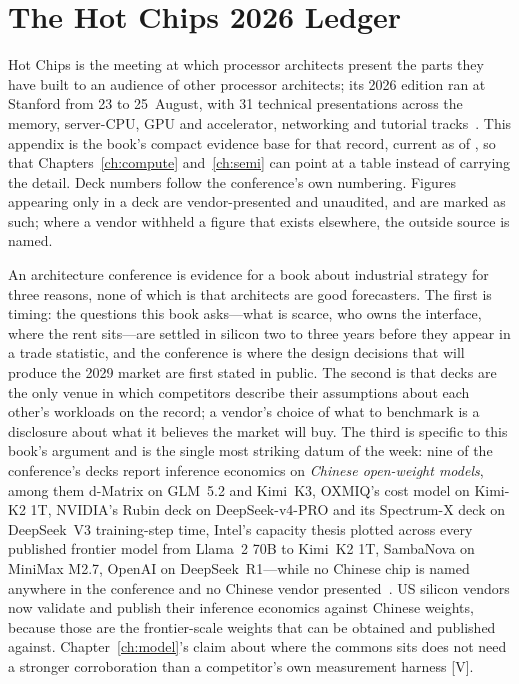 \chapter{The Hot Chips 2026 Ledger}
\label{app:hotchips}

Hot Chips is the meeting at which processor architects present the parts they have built to an audience of other processor architects; its 2026 edition ran at Stanford from 23 to 25~August, with 31 technical presentations across the memory, server-CPU, GPU and accelerator, networking and tutorial tracks~\cite{hc2026}. This appendix is the book's compact evidence base for that record, current as of \datafreeze, so that Chapters~\ref{ch:compute} and~\ref{ch:semi} can point at a table instead of carrying the detail. Deck numbers follow the conference's own numbering. Figures appearing only in a deck are vendor-presented and unaudited, and are marked as such; where a vendor withheld a figure that exists elsewhere, the outside source is named.

An architecture conference is evidence for a book about industrial strategy for three reasons, none of which is that architects are good forecasters. The first is timing: the questions this book asks---what is scarce, who owns the interface, where the rent sits---are settled in silicon two to three years before they appear in a trade statistic, and the conference is where the design decisions that will produce the 2029 market are first stated in public. The second is that decks are the only venue in which competitors describe their assumptions about each other's workloads on the record; a vendor's choice of what to benchmark is a disclosure about what it believes the market will buy. The third is specific to this book's argument and is the single most striking datum of the week: nine of the conference's decks report inference economics on \emph{Chinese open-weight models}, among them d-Matrix on GLM~5.2 and Kimi~K3, OXMIQ's cost model on Kimi-K2 1T, NVIDIA's Rubin deck on DeepSeek-v4-PRO and its Spectrum-X deck on DeepSeek~V3 training-step time, Intel's capacity thesis plotted across every published frontier model from Llama~2 70B to Kimi~K2 1T, SambaNova on MiniMax M2.7, OpenAI on DeepSeek~R1---while no Chinese chip is named anywhere in the conference and no Chinese vendor presented~\cite{hc2026-china-bench}. US silicon vendors now validate and publish their inference economics against Chinese weights, because those are the frontier-scale weights that can be obtained and published against. Chapter~\ref{ch:model}'s claim about where the commons sits does not need a stronger corroboration than a competitor's own measurement harness [V].

